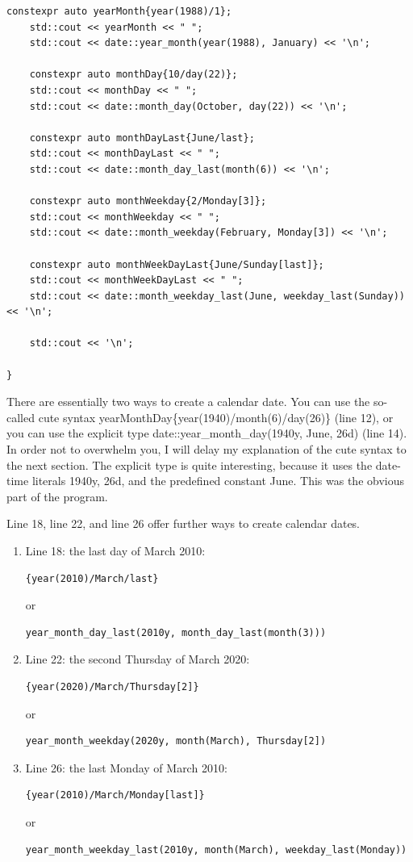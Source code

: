 \begin{lstlisting}[style=styleCXX]
	constexpr auto yearMonth{year(1988)/1};
	std::cout << yearMonth << " ";
	std::cout << date::year_month(year(1988), January) << '\n';
	
	constexpr auto monthDay{10/day(22)};
	std::cout << monthDay << " ";
	std::cout << date::month_day(October, day(22)) << '\n';
	
	constexpr auto monthDayLast{June/last};
	std::cout << monthDayLast << " ";
	std::cout << date::month_day_last(month(6)) << '\n';
	
	constexpr auto monthWeekday{2/Monday[3]};
	std::cout << monthWeekday << " ";
	std::cout << date::month_weekday(February, Monday[3]) << '\n';
	
	constexpr auto monthWeekDayLast{June/Sunday[last]};
	std::cout << monthWeekDayLast << " ";
	std::cout << date::month_weekday_last(June, weekday_last(Sunday)) << '\n';
	
	std::cout << '\n';

}
\end{lstlisting}

There are essentially two ways to create a calendar date. You can use the so-called cute syntax yearMonthDay\{year(1940)/month(6)/day(26)\} (line 12), or you can use the explicit type date::year\_month\_day(1940y, June, 26d) (line 14). In order not to overwhelm you, I will delay my explanation of the cute syntax to the next section. The explicit type is quite interesting, because it uses the date-time literals 1940y, 26d, and the predefined constant June. This was the obvious part of the program.

Line 18, line 22, and line 26 offer further ways to create calendar dates.

\begin{enumerate}
\item 
Line 18: the last day of March 2010: 
\begin{lstlisting}[style=styleCXX]
{year(2010)/March/last}
\end{lstlisting}
or
\begin{lstlisting}[style=styleCXX]
year_month_day_last(2010y, month_day_last(month(3)))
\end{lstlisting}

\item 
Line 22: the second Thursday of March 2020:
\begin{lstlisting}[style=styleCXX]
{year(2020)/March/Thursday[2]}
\end{lstlisting}
or
\begin{lstlisting}[style=styleCXX]
year_month_weekday(2020y, month(March), Thursday[2])
\end{lstlisting}

\item 
Line 26: the last Monday of March 2010: 
\begin{lstlisting}[style=styleCXX]
{year(2010)/March/Monday[last]}
\end{lstlisting}
or
\begin{lstlisting}[style=styleCXX]
year_month_weekday_last(2010y, month(March), weekday_last(Monday))
\end{lstlisting}
\end{enumerate}


